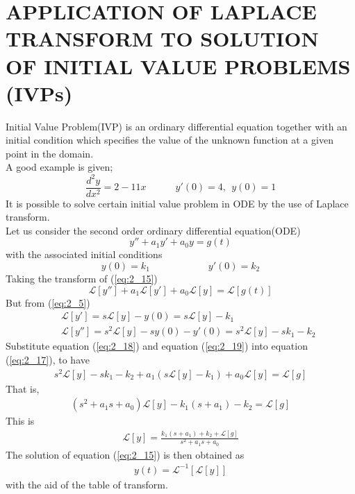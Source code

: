 \documentclass[11pt]{report}
\newcommand{\Laplace}{\mathcal{L}}
\newcommand{\sbracket}[1]{\left[#1\right]}
\newcommand{\LFn}[1]{\Laplace \sbracket{#1}}
\newcommand{\InverseL}[1]{\Laplace^{-1}\left[#1\right]}
\newcommand{\sps}{\\[0.2cm]}
\newcommand{\refn}[1]{(\ref{#1})}
\newcommand{\refx}[1]{\refn{eq:#1}}
\newcommand{\sprime}{'}
\newcommand{\dprime}{''}
\begin{document}
	\section{APPLICATION OF LAPLACE TRANSFORM TO SOLUTION OF INITIAL VALUE PROBLEMS (IVPs)}
	Initial Value Problem(IVP) is an ordinary differential equation together with an initial condition which specifies the value of the unknown function at a given point in the domain.\\A good example is given;
	\begin{equation*}
		\frac{d^2y}{dx^2}=2-11x \qquad\quad y\sprime(0)=4, ~~ y(0)=1
	\end{equation*}
	It is possible to solve certain initial value problem in ODE by the use of Laplace transform.\\
	Let us consider the second order ordinary differential equation(ODE)
	\begin{equation}
		y\dprime + a_1 y\sprime + a_0y = g(t)
		\label{eq:2_15}
	\end{equation}
	with the associated initial conditions
	\begin{equation}
		y(0)=k_1\qquad\qquad\qquad y\sprime(0)=k_2
		\label{eq:2_16}
	\end{equation}
	Taking the transform of \refx{2_15}
	\begin{equation}
		\LFn{y\dprime} + a_1\LFn{y\sprime} + a_0\LFn{y} = \LFn{g(t)}
		\label{eq:2_17}
	\end{equation}
	But from \refx{2_5}
	\begin{eqnarray}
		&&\LFn{y\sprime}=s\LFn{y} - y(0) = s\LFn{y} - k_1\label{eq:2_18}\sps
		&& \LFn{y\dprime} = s^2\LFn{y}-sy(0)-y\sprime(0)=s^2\LFn{y}-sk_1 - k_2\label{eq:2_19}
	\end{eqnarray}
	Substitute equation \refx{2_18} and equation \refx{2_19} into equation \refx{2_17}, to have
	\begin{eqnarray*}
		s^2\LFn{y}-sk_1 - k_2 + a_1(s\LFn{y} - k_1)+ a_0\LFn{y} = \LFn{g}
	\end{eqnarray*}
	That is,
	\begin{eqnarray}
		(s^2+a_1s+a_0)\LFn{y} - k_1(s+a_1)-k_2 = \LFn{g}\label{eq:2_20}
	\end{eqnarray}
	This is
	\begin{eqnarray}
		\LFn{y} = \frac{k_1(s+a_1)+k_2+\LFn{g}}{s^2 +a_1s+a_0}\label{eq:2_21}
	\end{eqnarray}
	The solution of equation \refx{2_15} is then obtained as
	\begin{eqnarray}
		y(t) = \InverseL{\LFn{y}}\label{eq:2_22}
	\end{eqnarray}
	with the aid of the table of transform.\sps
	
\end{document}
